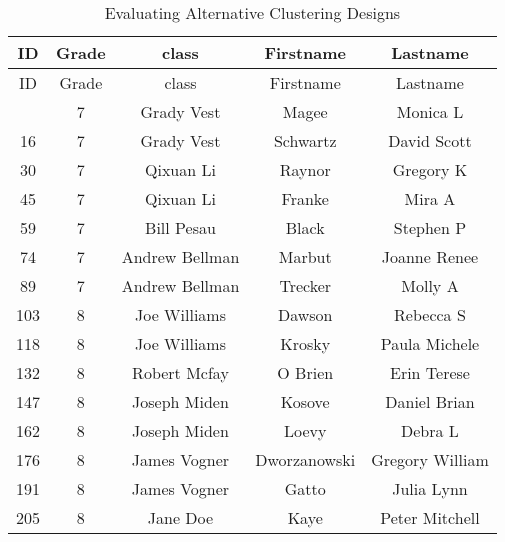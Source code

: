 \documentclass[
  12pt]{article}
\begin{document}
\begin{longtable}[]{@{}ccccc@{}}
\caption{Evaluating Alternative Clustering Designs}\tabularnewline
\toprule\noalign{}
ID & Grade & class & Firstname & Lastname \\
\midrule\noalign{}
\endfirsthead
\toprule\noalign{}
ID & Grade & class & Firstname & Lastname \\
\midrule\noalign{}
\endhead
\bottomrule\noalign{}
\endlastfoot
1 & 7 & Grady Vest & Magee & Monica L \\
16 & 7 & Grady Vest & Schwartz & David Scott \\
30 & 7 & Qixuan Li & Raynor & Gregory K \\
45 & 7 & Qixuan Li & Franke & Mira A \\
59 & 7 & Bill Pesau & Black & Stephen P \\
74 & 7 & Andrew Bellman & Marbut & Joanne Renee \\
89 & 7 & Andrew Bellman & Trecker & Molly A \\
103 & 8 & Joe Williams & Dawson & Rebecca S \\
118 & 8 & Joe Williams & Krosky & Paula Michele \\
132 & 8 & Robert Mcfay & O Brien & Erin Terese \\
147 & 8 & Joseph Miden & Kosove & Daniel Brian \\
162 & 8 & Joseph Miden & Loevy & Debra L \\
176 & 8 & James Vogner & Dworzanowski & Gregory William \\
191 & 8 & James Vogner & Gatto & Julia Lynn \\
205 & 8 & Jane Doe & Kaye & Peter Mitchell \\
\end{longtable}
\end{document}
